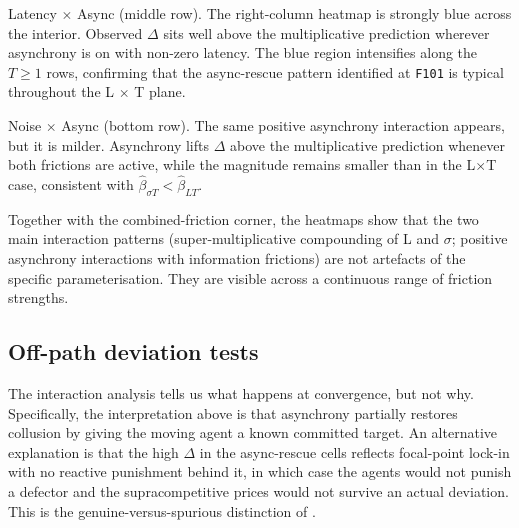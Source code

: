 Latency $\times$ Async (middle row). The right-column heatmap is strongly blue across the interior. Observed $\Delta$ sits well above the multiplicative prediction wherever asynchrony is on with non-zero latency. The blue region intensifies along the $T \geq 1$ rows, confirming that the async-rescue pattern identified at \texttt{F101} is typical throughout the L $\times$ T plane.

Noise $\times$ Async (bottom row). The same positive asynchrony interaction appears, but it is milder. Asynchrony lifts $\Delta$ above the multiplicative prediction whenever both frictions are active, while the magnitude remains smaller than in the L$\times$T case, consistent with $\widehat\beta_{\sigma T} < \widehat\beta_{LT}$.

Together with the combined-friction corner, the heatmaps show that the two main interaction patterns (super-multiplicative compounding of L and $\sigma$; positive asynchrony interactions with information frictions) are not artefacts of the specific parameterisation. They are visible across a continuous range of friction strengths.

\subsection{Off-path deviation tests}
\label{sec:factorial-offpath}

The interaction analysis tells us what happens at convergence, but not why. Specifically, the interpretation above is that asynchrony partially restores collusion by giving the moving agent a known committed target. An alternative explanation is that the high $\Delta$ in the async-rescue cells reflects focal-point lock-in with no reactive punishment behind it, in which case the agents would not punish a defector and the supracompetitive prices would not survive an actual deviation. This is the genuine-versus-spurious distinction of \citet{calvano2023}.

